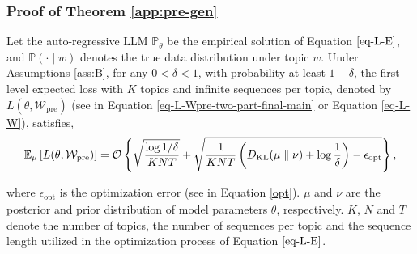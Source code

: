 \subsubsection{Proof of Theorem \ref{app:pre-gen}}\label{appendix-the-1}
\begin{theorem*} Let the auto-regressive LLM $\mathbb{P}_\theta$ be the empirical solution of Equation $\ref{eq-L-E}$, and $\mathbb{P}(\cdot\mid w)$ denotes the true data distribution under topic $w$. Under Assumptions \ref{ass:B}, for any $0<\delta < 1$, with probability at least $1-\delta$, the first-level expected loss with $K$ topics and infinite sequences per topic, denoted by $L(\theta, \mathcal{W}_{\text{pre}})$ (see in Equation \ref{eq-L-Wpre-two-part-final-main} or Equation \ref{eq-L-W}), satisfies,
    \begin{align*}
        \mathbb{E}_{\mu}\left[L(\theta, \mathcal{W}_{\text{pre}})\right]
        =\mathcal{O}\left\{\sqrt{\frac{\log 1/\delta}{KNT}}+\sqrt{\frac{1}{KNT}\left(D_{\mathrm{KL}}(\mu\parallel \nu)+\operatorname{log}\frac{1}{\delta}\right)-\epsilon_{\text{opt}}}\right\},
    \end{align*}

	where $\epsilon_{\text{opt}}$ is the optimization error (see in Equation \ref{opt}). $\mu$ and $\nu$ are the posterior and prior distribution of model parameters $\theta$, respectively. $K$, $N$ and $T$ denote the number of topics, the number of sequences per topic and the sequence length utilized in the optimization process of Equation $\ref{eq-L-E}$.
\end{theorem*}


